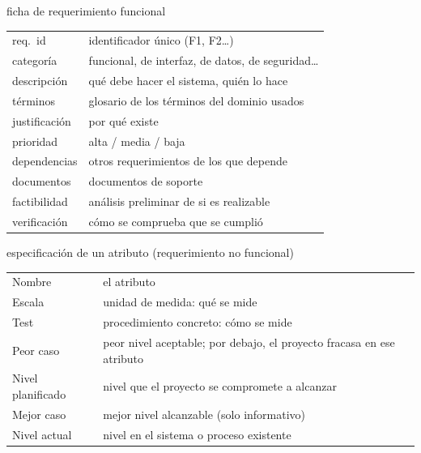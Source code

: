 \documentclass[11pt,a4paper]{article}
\begin{document}
\begin{plantilla}{ficha de requerimiento funcional}
\begin{tabularx}{\linewidth}{@{}l X@{}}
req.\ id & identificador único (F1, F2\ldots)\\
categoría & funcional, de interfaz, de datos, de seguridad\ldots\\
descripción & qué debe hacer el sistema, quién lo hace\\
términos & glosario de los términos del dominio usados\\
justificación & por qué existe\\
prioridad & alta / media / baja\\
dependencias & otros requerimientos de los que depende\\
documentos & documentos de soporte\\
factibilidad & análisis preliminar de si es realizable\\
verificación & cómo se comprueba que se cumplió\\
\end{tabularx}
\end{plantilla}
\begin{plantilla}{especificación de un atributo (requerimiento no funcional)}
\begin{tabularx}{\linewidth}{@{}l X@{}}
Nombre & el atributo\\
Escala & unidad de medida: qué se mide\\
Test & procedimiento concreto: cómo se mide\\
Peor caso & peor nivel aceptable; por debajo, el proyecto fracasa en ese atributo\\
Nivel planificado & nivel que el proyecto se compromete a alcanzar\\
Mejor caso & mejor nivel alcanzable (solo informativo)\\
Nivel actual & nivel en el sistema o proceso existente\\
\end{tabularx}
\end{plantilla}
\end{document}

